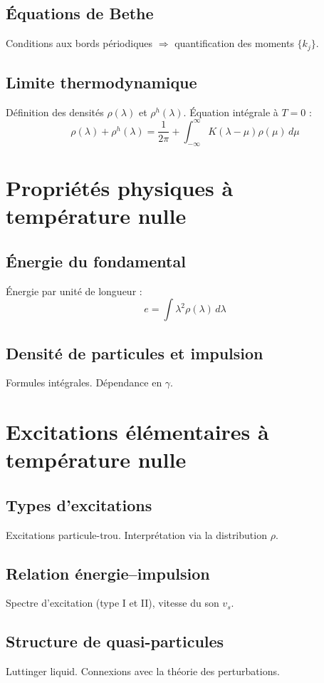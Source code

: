 \subsection{Équations de Bethe}
Conditions aux bords périodiques $\Rightarrow$ quantification des moments $\{k_j\}$.

\subsection{Limite thermodynamique}
Définition des densités $\rho(\lambda)$ et $\rho^h(\lambda)$. Équation intégrale à $T=0$ :
\[
\rho(\lambda) + \rho^h(\lambda) = \frac{1}{2\pi} + \int_{-\infty}^{\infty} K(\lambda - \mu) \rho(\mu) \, d\mu
\]

\section{Propriétés physiques à température nulle}

\subsection{Énergie du fondamental}
Énergie par unité de longueur :
\[
e = \int \lambda^2 \rho(\lambda) \, d\lambda
\]

\subsection{Densité de particules et impulsion}
Formules intégrales. Dépendance en $\gamma$.

\section{Excitations élémentaires à température nulle}

\subsection{Types d’excitations}
Excitations particule-trou. Interprétation via la distribution $\rho$.

\subsection{Relation énergie–impulsion}
Spectre d’excitation (type I et II), vitesse du son $v_s$.

\subsection{Structure de quasi-particules}
Luttinger liquid. Connexions avec la théorie des perturbations.

